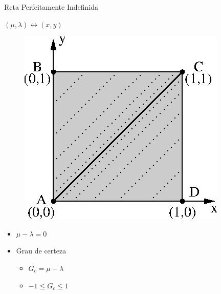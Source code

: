 \begin{frame}{Reta Perfeitamente Indefinida}
\begin{block}{ \centering   $(\mu, \lambda ) \leftrightarrow (x,y) $ } \end{block}
\vspace{1cm}
\begin{minipage}{0.50\linewidth}
\begin{figure}[!htb]
\center\includegraphics[scale=1.0]{./imagens/C426retaPerfeitamenteIndefinida.eps}
\end{figure}
\end{minipage}
\begin{minipage}{0.45\linewidth}

\begin{itemize}
\item $\mu - \lambda = 0$
\item Grau de certeza
  \begin{itemize}
    \item $G _{c} = \mu - \lambda$
    \item $-1 \leqslant G _{c} \leqslant 1$
  \end{itemize}
\end{itemize}
\end{minipage}

\end{frame}

